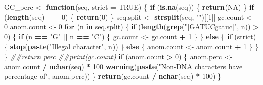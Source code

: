 \documentclass[]{book}
\newenvironment{Shaded}{\begin{snugshade}}{\end{snugshade}}
\newcommand{\CommentTok}[1]{\textcolor[rgb]{0.56,0.35,0.01}{\textit{#1}}}
\newcommand{\ControlFlowTok}[1]{\textcolor[rgb]{0.13,0.29,0.53}{\textbf{#1}}}
\newcommand{\DataTypeTok}[1]{\textcolor[rgb]{0.13,0.29,0.53}{#1}}
\newcommand{\DecValTok}[1]{\textcolor[rgb]{0.00,0.00,0.81}{#1}}
\newcommand{\KeywordTok}[1]{\textcolor[rgb]{0.13,0.29,0.53}{\textbf{#1}}}
\newcommand{\NormalTok}[1]{#1}
\newcommand{\OperatorTok}[1]{\textcolor[rgb]{0.81,0.36,0.00}{\textbf{#1}}}
\newcommand{\OtherTok}[1]{\textcolor[rgb]{0.56,0.35,0.01}{#1}}
\newcommand{\StringTok}[1]{\textcolor[rgb]{0.31,0.60,0.02}{#1}}
\begin{document}
\begin{Shaded}
\begin{Highlighting}[]
\NormalTok{GC_perc <-}\StringTok{ }\ControlFlowTok{function}\NormalTok{(seq, }\DataTypeTok{strict =} \OtherTok{TRUE}\NormalTok{) \{}
        \ControlFlowTok{if}\NormalTok{ (}\KeywordTok{is.na}\NormalTok{(seq)) \{}
                \KeywordTok{return}\NormalTok{(}\OtherTok{NA}\NormalTok{)}
\NormalTok{        \}}
        \ControlFlowTok{if}\NormalTok{ (}\KeywordTok{length}\NormalTok{(seq) }\OperatorTok{==}\StringTok{ }\DecValTok{0}\NormalTok{) \{}
                \KeywordTok{return}\NormalTok{(}\DecValTok{0}\NormalTok{)}
\NormalTok{        \}}
\NormalTok{        seq.split <-}\StringTok{ }\KeywordTok{strsplit}\NormalTok{(seq, }\StringTok{""}\NormalTok{)[[}\DecValTok{1}\NormalTok{]]}
\NormalTok{        gc.count <-}\StringTok{ }\DecValTok{0}
\NormalTok{        anom.count <-}\StringTok{ }\DecValTok{0}
        \ControlFlowTok{for}\NormalTok{ (n }\ControlFlowTok{in}\NormalTok{ seq.split) \{}
                \ControlFlowTok{if}\NormalTok{ (}\KeywordTok{length}\NormalTok{(}\KeywordTok{grep}\NormalTok{(}\StringTok{"[GATUCgatuc]"}\NormalTok{, n)) }\OperatorTok{>}\StringTok{ }\DecValTok{0}\NormalTok{) \{}
                        \ControlFlowTok{if}\NormalTok{ (n }\OperatorTok{==}\StringTok{ "G"} \OperatorTok{||}\StringTok{ }\NormalTok{n }\OperatorTok{==}\StringTok{ "C"}\NormalTok{) \{}
\NormalTok{                                gc.count <-}\StringTok{ }\NormalTok{gc.count }\OperatorTok{+}\StringTok{ }\DecValTok{1}
\NormalTok{                        \}}
\NormalTok{                \} }\ControlFlowTok{else}\NormalTok{ \{}
                        \ControlFlowTok{if}\NormalTok{ (strict) \{}
                                \KeywordTok{stop}\NormalTok{(}\KeywordTok{paste}\NormalTok{(}\StringTok{"Illegal character"}\NormalTok{, n))}
\NormalTok{                        \} }\ControlFlowTok{else}\NormalTok{ \{}
\NormalTok{                                anom.count <-}\StringTok{ }\NormalTok{anom.count }\OperatorTok{+}\StringTok{ }\DecValTok{1}     
\NormalTok{                        \}}
\NormalTok{                \}}
\NormalTok{        \}}
        \CommentTok{##return perc}
        \CommentTok{##print(gc.count)}
        \ControlFlowTok{if}\NormalTok{ (anom.count }\OperatorTok{>}\StringTok{ }\DecValTok{0}\NormalTok{) \{}
\NormalTok{                anom.perc <-}\StringTok{ }\NormalTok{anom.count }\OperatorTok{/}\StringTok{ }\KeywordTok{nchar}\NormalTok{(seq) }\OperatorTok{*}\StringTok{ }\DecValTok{100}
                \KeywordTok{warning}\NormalTok{(}\KeywordTok{paste}\NormalTok{(}\StringTok{"Non-DNA characters have percentage of"}\NormalTok{, anom.perc))}
\NormalTok{        \}}
        \KeywordTok{return}\NormalTok{(gc.count }\OperatorTok{/}\StringTok{ }\KeywordTok{nchar}\NormalTok{(seq) }\OperatorTok{*}\StringTok{ }\DecValTok{100}\NormalTok{)}
\NormalTok{\}}
\end{Highlighting}
\end{Shaded}
\end{document}
